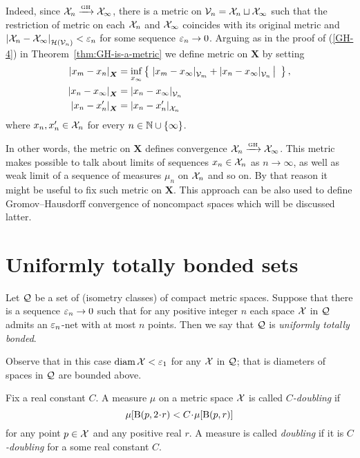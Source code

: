 Indeed, since $\mathcal{X}_n\xrightarrow{\mbox{\tiny GH}} \mathcal{X}_\infty$, there is a metric on $\mathcal{V}_n=\mathcal{X}_n\sqcup \mathcal{X}_\infty$ such that the restriction of metric on each $\mathcal{X}_n$ and $\mathcal{X}_\infty$ coincides with its original metric and $\dist{\spc{X}_n}{\spc{X}_\infty}{\mathcal{H}(\spc{V}_n)}<\eps_n$ for some sequence $\varepsilon_n\to 0$.
Arguing as in the proof of (\ref{GH-4}) in Theorem~\ref{thm:GH-is-a-metric}
we define metric on $\bm{X}$ by setting 
\begin{align*}
\dist{x_m}{x_n}{\bm{X}}&=\inf_{x_\infty}\set{\dist{x_m}{x_\infty}{\spc{V}_m}+\dist{x_n}{x_\infty}{\spc{V}_n}}{},
\\
\dist{x_n}{x_\infty}{\bm{X}}&=\dist{x_n}{x_\infty}{\spc{V}_n}
\\
\dist{x_n}{x'_n}{\bm{X}}&=\dist{x_n}{x_n'}{\spc{X}_n}
\end{align*}
where $x_n,x_n'\in\mathcal{X}_n$ for every $n\in \mathbb{N}\cup\{\infty\}$.

In other words, the metric on $\bm{X}$ defines convergence $\mathcal{X}_n\xrightarrow{\mbox{\tiny GH}} \mathcal{X}_\infty$.
This metric makes possible to talk about limits of sequences $x_n\in \mathcal{X}_n$ as $n\to\infty$, as well as weak limit of a sequence of measures $\mu_n$ on $\mathcal{X}_n$ and so on.
By that reason it might be useful to fix such metric on $\bm{X}$.
This approach can be also used to define Gromov--Hausdorff convergence of noncompact spaces which will be discussed latter.




\section{Uniformly totally bonded sets}

Let $\mathcal{Q}$ be a set of (isometry classes) of compact metric spaces.
Suppose that there is a sequence $\varepsilon_n\to 0$ such that for any positive integer $n$ each space $\mathcal{X}$ in $\mathcal{Q}$ admits an $\varepsilon_n$-net with at most $n$ points.
Then we say that $\mathcal{Q}$ is \emph{uniformly totally bonded}.

Observe that in this case $\operatorname{\rm diam}\nolimits\mathcal{X}<\varepsilon_1$ for any  $\mathcal{X}$ in $\mathcal{Q}$; that is diameters of spaces in $\mathcal{Q}$ are bounded above.

Fix a real constant $C$.
A measure $\mu$ on a metric space $\mathcal{X}$ is called \emph{$C$-doubling} if
\[\mu[\oBall(p,2\cdot r)< C\cdot\mu[\oBall(p,r)]\]
for any point $p\in \mathcal{X}$ and any positive real $r$.
A measure is called \emph{doubling} if it is \emph{$C$-doubling} for a some real constant $C$.


